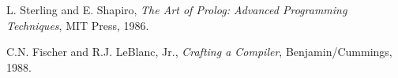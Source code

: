 \begin{thebibliography}{99}

L. Sterling and E. Shapiro, {\it The Art of Prolog: Advanced Programming
Techniques}, {\small MIT} Press, 1986.

C.N. Fischer and R.J. LeBlanc, Jr., {\it Crafting a Compiler},
Benjamin/Cummings, 1988.

\end{thebibliography}
